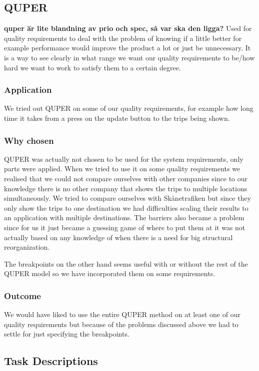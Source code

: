 \documentclass[a4paper]{article}
\begin{document}
	\subsection{QUPER}
		\textbf{quper är lite blandning av prio och spec, så var ska den ligga?}
		Used for quality requirements to deal with the problem of knowing if a little better for example performance would improve the product a lot or just be unnecessary. It is a way to see clearly in what range we want our quality requirements to be/how hard we want to work to satisfy them to a certain degree.
    	\subsubsection{Application}
    	We tried out QUPER on some of our quality requirements, for example how long time it takes from a press on the update button to the trips being shown.
    	\subsubsection{Why chosen}
    	QUPER was actually not chosen to be used for the system requirements, only parts were applied. When we tried to use it on some quality requirements we realised that we could not compare ourselves with other companies since to our knowledge there is no other company that shows the trips to multiple locations simultaneously. We tried to compare ourselves with Skånetrafiken but since they only show the trips to one destination we had difficulties scaling their results to an application with multiple destinations. The barriers also became a problem since for us it just became a guessing game of where to put them at it was not actually based on any knowledge of when there is a need for big structural reorganization. 
    	
    	The breakpoints on the other hand seems useful with or without the rest of the QUPER model so we have incorporated them on some requirements.

	    \subsubsection{Outcome}
		We would have liked to use the entire QUPER method on at least one of our quality requirements but because of the problems discussed above we had to settle for just specifying the breakpoints.		
		
		
	\subsection{Task Descriptions}
\end{document}
